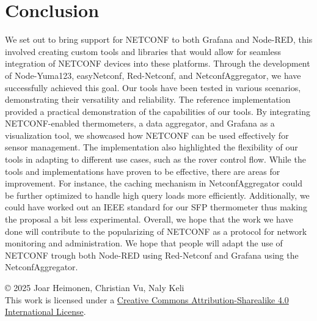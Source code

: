 \documentclass[12pt]{article}
\newcommand{\license}{
    \vspace{1em}
    \noindent\small{© 2025 Joar Heimonen,  Christian Vu, Naly Keli\\
    This work is licensed under a \href{https://creativecommons.org/licenses/by-sa/4.0/}{Creative Commons Attribution-Sharealike 4.0 International License}.}
}
\begin{document}
\section{Conclusion}
We set out to bring support for NETCONF to both Grafana and Node-RED, this involved creating 
custom tools and libraries that would allow for seamless integration of NETCONF devices into these platforms. 
Through the development of Node-Yuma123, easyNetconf, Red-Netconf, and NetconfAggregator, we have successfully achieved this goal. 
Our tools have been tested in various scenarios, demonstrating their versatility and reliability.
The reference implementation provided a practical demonstration of the capabilities of our tools. By integrating NETCONF-enabled thermometers, 
a data aggregator, and Grafana as a visualization tool, we showcased how NETCONF can be used effectively for sensor management. 
The implementation also highlighted the flexibility of our tools in adapting to different use cases, such as the rover control flow.
While the tools and implementations have proven to be effective, there are areas for improvement. For instance, the caching mechanism in NetconfAggregator 
could be further optimized to handle high query loads more efficiently. Additionally, we could have worked out an IEEE standard for our SFP thermometer
thus making the proposal a bit less experimental.
Overall, we hope that the work we have done will contribute to the popularizing of NETCONF as a protocol for network monitoring and 
administration. We hope that people will adapt the use of NETCONF trough both Node-RED using Red-Netconf and Grafana using the NetconfAggregator.

\pagebreak
{}
\printbibliography
\listoffigures
\license
\end{document}
